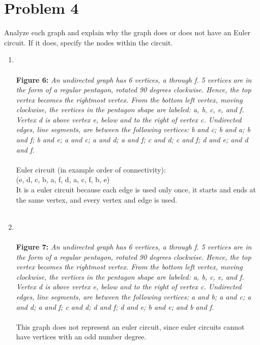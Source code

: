 \documentclass{amsart}
\theoremstyle{definition}
\theoremstyle{Exercise}
\theoremstyle{remark}
\theoremstyle{rule}
\numberwithin{equation}{section}
\begin{document}
  \section*{Problem 4}
 Analyze each graph and explain why the graph does or does not have an Euler circuit. If it does, specify the nodes within the circuit.
  \begin{enumerate}[label=(\roman*)]
\item 
{}
\\\\
{\color{blue} {\bf Figure 6:} \emph{An undirected graph has 6 vertices, a through f. 5 vertices are in the form of a regular pentagon, rotated 90 degrees clockwise. Hence, the top vertex becomes the rightmost vertex. From the bottom left vertex, moving clockwise, the vertices in the pentagon shape are labeled: a, b, c, e, and f. Vertex d is above vertex e, below and to the right of vertex c. Undirected edges, line segments, are between the following vertices: b and c; b and a; b and f; b and e; a and c; a and d; a and f; c and d; c and f; d and e; and d and f.
  }
}\\\\
  Euler circuit (in example order of connectivity):\\
  (e, d, c, b, a, f, d, a, c, f, b, e)\\
  It is a euler circuit because each edge is used only once, it starts and ends at the same vertex, and every vertex and edge is used.
\\\\
   \newpage
\item
{}
\\\\
{\color{blue} {\bf Figure 7:} \emph{
An undirected graph has 6 vertices, a through f. 5 vertices are in the form of a regular pentagon, rotated 90 degrees clockwise. Hence, the top vertex becomes the rightmost vertex. From the bottom left vertex, moving clockwise, the vertices in the pentagon shape are labeled: a, b, c, e, and f. Vertex d is above vertex e, below and to the right of vertex c. Undirected edges, line segments, are between the following vertices: a and b; a and c; a and d; a and f; c and d; d and f; d and e; b and e; and b and f.
  }
}
\\\\
  This graph does not represent an euler circuit, since euler circuits cannot have vertices with an odd number degree.\\

\end{enumerate}
\end{document}
